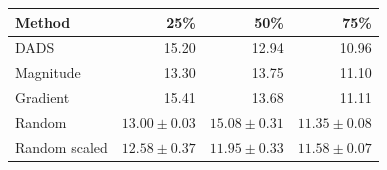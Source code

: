 \begin{tabular}{@{}lrrr@{}}
\toprule
Method & 25\% & 50\% & 75\%\\
\midrule
DADS & 15.20 & 12.94 & 10.96\\
Magnitude & 13.30 & 13.75 & 11.10\\
Gradient & 15.41 & 13.68 & 11.11\\
Random & $13.00\pm0.03$ & $15.08\pm0.31$ & $11.35\pm0.08$\\
Random scaled & $12.58\pm0.37$ & $11.95\pm0.33$ & $11.58\pm0.07$\\
\bottomrule
\end{tabular}
